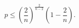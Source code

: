 \begin{equation}
p \le \left(\frac{2}{n}\right)^\frac{2}{n-2}\left(1 -\frac{2}{n}\right)\label{psqsh}.\label{4.6}
\end{equation}

